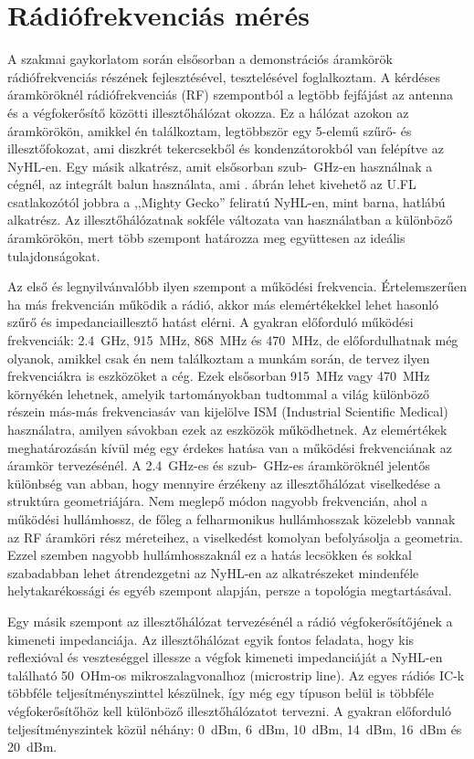     \section{Rádiófrekvenciás mérés}
        A szakmai gaykorlatom során elsősorban a demonstrációs áramkörök rádiófrekvenciás részének fejlesztésével, tesztelésével foglalkoztam. A kérdéses áramköröknél rádiófrekvenciás (RF) szempontból a legtöbb fejfájást az antenna és a végfokerősítő közötti illesztőhálózat okozza. Ez a hálózat azokon az áramkörökön, amikkel én találkoztam, legtöbbször egy 5-elemű szűrő- és illesztőfokozat, ami diszkrét tekercsekből és kondenzátorokból van felépítve az NyHL-en. Egy másik alkatrész, amit elsősorban szub-\SI{}{GHz}-en használnak a cégnél, az integrált balun használata, ami . ábrán lehet kivehető az U.FL csatlakozótól jobbra a ,,Mighty Gecko'' feliratú NyHL-en, mint barna, hatlábú alkatrész. Az illesztőhálózatnak sokféle változata van használatban a különböző áramkörökön, mert több szempont határozza meg együttesen az ideális tulajdonságokat.
        \par
        Az első és legnyilvánvalóbb ilyen szempont a működési frekvencia. Értelemszerűen ha más frekvencián működik a rádió, akkor más elemértékekkel lehet hasonló szűrő és impedanciaillesztő hatást elérni. A gyakran előforduló működési frekvenciák: \SI{2,4}{GHz}, \SI{915}{MHz}, \SI{868}{MHz} és \SI{470}{MHz}, de előfordulhatnak még olyanok, amikkel csak én nem találkoztam a munkám során, de tervez ilyen frekvenciákra is eszközöket a cég. Ezek elsősorban \SI{915}{MHz} vagy \SI{470}{MHz} környékén lehetnek, amelyik tartományokban tudtommal a világ különböző részein más-más frekvenciasáv van kijelölve ISM (Industrial Scientific Medical) használatra, amilyen sávokban ezek az eszközök működhetnek. Az elemértékek meghatározásán kívül még egy érdekes hatása van a működési frekvenciának az áramkör tervezésénél. A \SI{2,4}{GHz}-es és szub-\SI{}{GHz}-es áramköröknél jelentős különbség van abban, hogy mennyire érzékeny az illesztőhálózat viselkedése a struktúra geometriájára. Nem meglepő módon nagyobb frekvencián, ahol a működési hullámhossz, de főleg a felharmonikus hullámhosszak közelebb vannak az RF áramköri rész méreteihez, a viselkedést komolyan befolyásolja a geometria. Ezzel szemben nagyobb hullámhosszaknál ez a hatás lecsökken és sokkal szabadabban lehet átrendezgetni az NyHL-en az alkatrészeket mindenféle helytakarékossági és egyéb szempont alapján, persze a topológia megtartásával.
        \par
        Egy másik szempont az illesztőhálózat tervezésénél a rádió végfokerősítőjének a kimeneti impedanciája. Az illesztőhálózat egyik fontos feladata, hogy kis reflexióval és veszteséggel illessze a végfok kimeneti impedanciáját a NyHL-en található \SI{50}{OHm}-os mikroszalagvonalhoz (microstrip line). Az egyes rádiós IC-k többféle teljesítményszinttel készülnek, így még egy típuson belül is többféle végfokerősítőhöz kell különböző illesztőhálózatot tervezni. A gyakran előforduló teljesítményszintek közül néhány: \SI{0}{dBm}, \SI{6}{dBm}, \SI{10}{dBm}, \SI{14}{dBm}, \SI{16}{dBm} és \SI{20}{dBm}.
